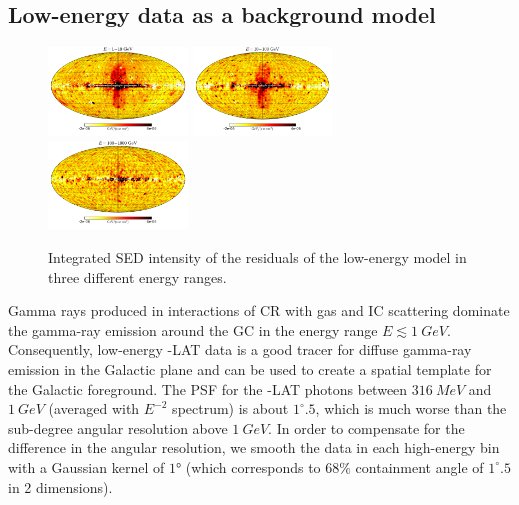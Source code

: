 \subsection{Low-energy data as a background model}
\label{sec:le_data_model}

\begin{figure}[t]
\includegraphics[width=0.33\textwidth]{plots/Mollweide_LowE_03-10GeV_flux_source_range_0.pdf}
\includegraphics[width=0.33\textwidth]{plots/Mollweide_LowE_03-10GeV_flux_source_range_1.pdf}
\includegraphics[width=0.33\textwidth]{plots/Mollweide_LowE_03-10GeV_flux_source_range_2.pdf}
\caption{Integrated SED intensity of the residuals of the low-energy model in three different energy ranges. }
\label{fig:Maps_lowE}
\end{figure}

Gamma rays produced in interactions of CR with gas and IC scattering dominate the gamma-ray emission around the GC in the energy range $E \lesssim \SI{1}{GeV}$. 
Consequently, low-energy \Fermi-LAT data is a good tracer for diffuse gamma-ray emission in the Galactic plane and can be used to create a spatial template for the Galactic foreground.
The PSF for the \Fermi-LAT photons between $\SI{316}{MeV}$ and $\SI{1}{GeV}$ (averaged with $E^{-2}$ spectrum) is about $1^\circ\!\!.5$,
which is much worse than the sub-degree angular resolution above $\SI{1}{GeV}$.
In order to compensate for the difference in the angular resolution, 
we smooth the data in each high-energy bin with a Gaussian kernel of $\ang{1}$ (which corresponds to $68\%$ containment angle of
$1^\circ\!\!.5$ in 2 dimensions).

